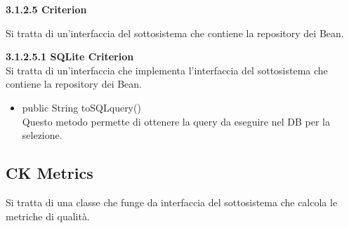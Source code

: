 \documentclass[11pt]{article}
\begin{document}
\begin{description}
			\item \textbf{3.1.2.5  Criterion}
			
			Si tratta di un'interfaccia del sottosistema che contiene la repository dei Bean.
				\item \textbf{ 3.1.2.5.1  SQLite Criterion} \\
			Si tratta di un'interfaccia che implementa l'interfaccia del sottosistema che contiene la repository dei Bean.
			\begin{itemize}
				\item public String toSQLquery()\\
				Questo metodo permette di ottenere la query da eseguire nel DB per la selezione.
			\end{itemize}
		
		\end{description}
			
		
		\subsection{CK Metrics}
		Si tratta di una classe che funge da interfaccia del sottosistema che calcola le metriche di qualità. 
		
\end{document}
